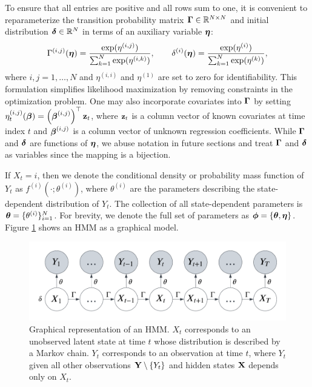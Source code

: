 To ensure that all entries are positive and all rows sum to one, it is convenient to reparameterize the transition probability matrix $\boldsymbol{\Gamma} \in \mathbb{R}^{N \times N}$ and initial distribution $\boldsymbol{\delta} \in \mathbb{R}^N$ in terms of an auxiliary variable $\boldsymbol{\eta}$: %
%
\begin{equation}
    \Gamma^{(i,j)}(\boldsymbol{\eta}) = \frac{\exp(\eta^{(i,j)})}{\sum_{k=1}^N \exp(\eta^{(i,k)})}, \qquad \delta^{(i)}(\boldsymbol{\eta}) = \frac{\exp(\eta^{(i)})}{\sum_{k=1}^N \exp(\eta^{(k)})},
    \label{eqn:reparam}
\end{equation}
%
where $i,j = 1,\ldots,N$ and $\eta^{(i,i)}$ and $\eta^{(1)}$ are set to zero for identifiability. This formulation simplifies likelihood maximization by removing constraints in the optimization problem. One may also incorporate covariates into $\boldsymbol{\Gamma}$ by setting $\eta_t^{(i,j)}(\boldsymbol{\beta}) = \left(\boldsymbol{\beta}^{(i,j)}\right)^{\top} \mathbf{z}_t$, where $\mathbf{z}_t$ is a column vector of known covariates at time index $t$ and $\boldsymbol{\beta}^{(i,j)}$ is a column vector of unknown regression coefficients. While $\boldsymbol{\Gamma}$ and $\boldsymbol{\delta}$ are functions of $\boldsymbol{\eta}$, we abuse notation in future sections and treat $\boldsymbol{\Gamma}$ and $\boldsymbol{\delta}$ as variables since the mapping is a bijection.

If $X_t=i$, then we denote the conditional density or probability mass function of $Y_t$ as $f^{(i)}(\cdot ; \theta^{(i)})$, where $\theta^{(i)}$ are the parameters describing the state-dependent distribution of $Y_t$. The collection of all state-dependent parameters is $\boldsymbol{\theta} = \{\theta^{(i)}\}_{i=1}^N$. For brevity, we denote the full set of parameters as $\boldsymbol{\phi} = \{\boldsymbol{\theta},\boldsymbol{\eta}\}$. Figure \ref{fig:HMM} shows an HMM as a graphical model.

\begin{figure}%
    \centering
    \includegraphics[width=5in]{../plt/HMM.png}
    \caption{Graphical representation of an HMM. $X_t$ corresponds to an unobserved latent state at time $t$ whose distribution is described by a Markov chain. $Y_t$ corresponds to an observation at time $t$, where $Y_t$ given all other observations $\mathbf{Y} \setminus \{Y_t\}$ and hidden states $\mathbf{X}$ depends only on $X_t$.}
    \label{fig:HMM}
\end{figure}
%

